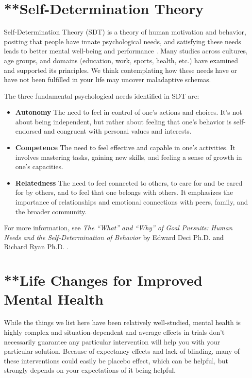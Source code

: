 \documentclass[12pt,letterpaper]{book}
\begin{document}
\chapter{**Self-Determination Theory}
\label{sec:sdt}
Self-Determination Theory (SDT) is a theory of human motivation and behavior, positing that people have innate psychological needs, and satisfying these needs leads to better mental well-being and performance \cite{deciSDT}. Many studies across cultures, age groups, and domains (education, work, sports, health, etc.) have examined and supported its principles. We think contemplating how these needs have or have not been fulfilled in your life may uncover maladaptive schemas.

The three fundamental psychological needs identified in SDT are:
\begin{itemize}
    \item \textbf{Autonomy} The need to feel in control of one's actions and choices. It's not about being independent, but rather about feeling that one's behavior is self-endorsed and congruent with personal values and interests.
    \item \textbf{Competence} The need to feel effective and capable in one's activities. It involves mastering tasks, gaining new skills, and feeling a sense of growth in one's capacities.
    \item \textbf{Relatedness} The need to feel connected to others, to care for and be cared for by others, and to feel that one belongs with others. It emphasizes the importance of relationships and emotional connections with peers, family, and the broader community.
\end{itemize}
For more information, see \textit{The “What” and “Why” of Goal Pursuits: Human Needs and the Self-Determination of Behavior} by Edward Deci Ph.D. and Richard Ryan Ph.D. \cite{deciSDT}.
\chapter{**Life Changes for Improved Mental Health}
\label{sec:lifechanges}
While the things we list here have been relatively well-studied, mental health is highly complex and situation-dependent and average effects in trials don't necessarily guarantee any particular intervention will help you with your particular solution. Because of expectancy effects and lack of blinding, many of these interventions could easily be placebo effect, which can be helpful, but strongly depends on your expectations of it being helpful.
\end{document}
